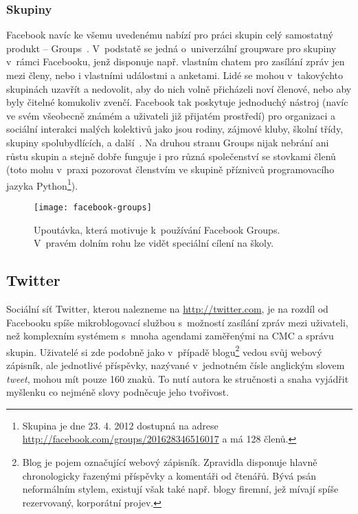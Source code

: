 \documentclass[12pt,oneside,final]{fithesis2}
\begin{document}
\subsubsection*{Skupiny}
Facebook navíc ke všemu uvedenému nabízí pro práci skupin celý samostatný produkt -- Groups~\cite{chai2010new}. V~podstatě se jedná o~univerzální groupware pro skupiny v~rámci Facebooku, jenž disponuje např. vlastním chatem pro zasílání zpráv jen mezi členy, nebo i vlastními událostmi a anketami. Lidé se mohou v~takovýchto skupinách uzavřít a nedovolit, aby do nich volně přicházeli noví členové, nebo aby byly čitelné komukoliv zvenčí. Facebook tak poskytuje jednoduchý nástroj (navíc ve svém všeobecně známém a uživateli již přijatém prostředí) pro organizaci a sociální interakci malých kolektivů jako jsou rodiny, zájmové kluby, školní třídy, skupiny spolubydlících, a další~\cite{novati2012introducing}. Na druhou stranu Groups nijak nebrání ani růstu skupin a stejně dobře funguje i pro různá společenství se stovkami členů (toto mohu v~praxi pozorovat členstvím ve skupině příznivců programovacího jazyka Python\footnote{Skupina je dne 23. 4. 2012 dostupná na adrese \url{http://facebook.com/groups/201628346516017} a má 128 členů.}).

\begin{figure}[h]
    \texttt{[image: facebook-groups]}
    \caption{Upoutávka, která motivuje k~používání Facebook Groups. V~pravém dolním rohu lze vidět speciální cílení na školy.}
\end{figure}

\subsection{Twitter}\label{twitter}
Sociální síť Twitter, kterou nalezneme na \url{http://twitter.com}, je na rozdíl od Facebooku spíše mikroblogovací službou s~možností zasílání zpráv mezi uživateli, než komplexním systémem s~mnoha agendami zaměřenými na CMC a správu skupin. Uživatelé si zde podobně jako v~případě blogu\footnote{Blog je pojem označující webový zápisník. Zpravidla disponuje hlavně chronologicky řazenými příspěvky a komentáři od čtenářů. Bývá psán neformálním stylem, existují však také např. blogy firemní, jež mívají spíše rezervovaný, korporátní projev.} vedou svůj webový zápisník, ale jednotlivé příspěvky, nazývané v~jednotném čísle anglickým slovem \emph{tweet}, mohou mít pouze 160 znaků. To nutí autora ke stručnosti a snaha vyjádřit myšlenku co nejméně slovy podněcuje jeho tvořivost.
\end{document}

